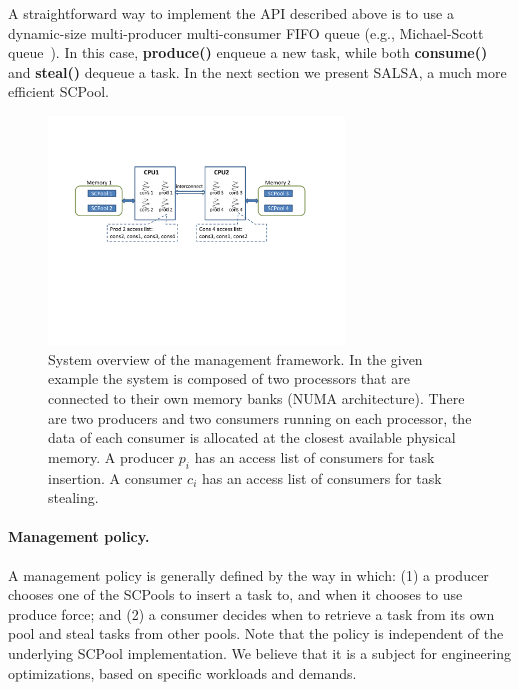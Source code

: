 A straightforward way to implement the API described above is to use a dynamic-size multi-producer multi-consumer FIFO queue (e.g., Michael-Scott queue~\cite{Michael:1996:SFP:248052.248106}).
In this case, {\bf produce()} enqueue a new task, while both {\bf consume()} and {\bf steal()} dequeue a task. In the next section we present SALSA, a much more efficient SCPool.

\begin{figure}[htb]
	\centering
	\includegraphics[width=0.7\textwidth]{figures/system-fig}
	\caption{\footnotesize{System overview of the management framework. In the given example the system is composed of two processors that are connected to their own memory banks (NUMA architecture). There are two producers and two consumers running on each processor, the data of each consumer is allocated at the closest available physical memory. A producer $p_i$ has an access list of consumers for task insertion. A consumer $c_i$ has an access list of consumers for task stealing. }}
	\label{fig:system-fig}
\end{figure}

\paragraph {Management policy.}
A management policy is generally defined by the way in which: (1) a producer chooses one of the SCPools to insert a task to, and when it chooses to use produce force; and (2) a consumer decides when to retrieve a task from its own pool and steal tasks from other pools. 
Note that the policy is independent of the underlying SCPool implementation. We believe that it is a subject for engineering optimizations, based on specific workloads and demands.


